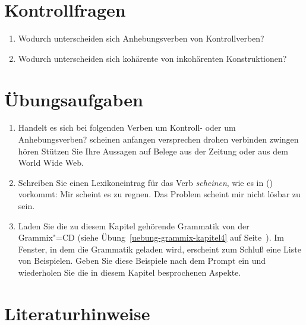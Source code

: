 {\section*{Kontrollfragen}


\begin{enumerate}
\item Wodurch unterscheiden sich Anhebungsverben von Kontrollverben?
\item Wodurch unterscheiden sich kohärente von inkohärenten Konstruktionen?
\end{enumerate}

\section*{Übungsaufgaben}

\begin{enumerate}
\item Handelt es sich bei folgenden Verben um Kontroll- oder um Anhebungsverben?
      \eal
      \ex scheinen
      \ex anfangen
      \ex versprechen
      \ex drohen
      \ex verbinden
      \ex zwingen
      \ex hören
      \zl
      Stützen Sie Ihre Aussagen auf Belege aus der Zeitung oder aus dem World Wide Web.

\item Schreiben Sie einen Lexikoneintrag für das Verb \emph{scheinen}, wie es in () vorkommt:
      \eal
      \ex Mir scheint es zu regnen.
      \ex Das Problem scheint mir nicht lösbar zu sein.
      \zl


\item Laden Sie die zu diesem Kapitel gehörende Grammatik von der Grammix"=CD
(siehe Übung~\ref{uebung-grammix-kapitel4} auf Seite~\pageref{uebung-grammix-kapitel4}).
Im Fenster, in dem die Grammatik geladen wird, erscheint zum Schluß eine Liste von Beispielen.
Geben Sie diese Beispiele nach dem Prompt ein und wiederholen Sie die in diesem Kapitel besprochenen
Aspekte.
      
\end{enumerate}

\section*{Literaturhinweise}

}
